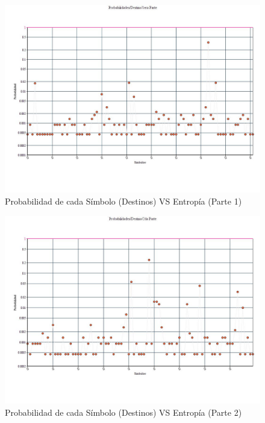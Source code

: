 \newpage

\begin{figure}[H]
  \centering
    \includegraphics[scale=0.45]{imagenes/graficos/Probabilidades/02destino1eraParte.jpg}
  \caption{Probabilidad de cada Símbolo (Destinos) VS Entropía (Parte 1)}
  \label{fig:5}
\end{figure}

\begin{figure}[H]
  \centering
    \includegraphics[scale=0.45]{imagenes/graficos/Probabilidades/02destino2daParte.jpg}
  \caption{Probabilidad de cada Símbolo (Destinos) VS Entropía (Parte 2)}
  \label{fig:6}
\end{figure}

\newpage

